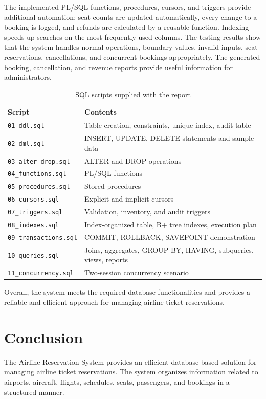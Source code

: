 \documentclass[12pt,a4paper]{article}
\begin{document}
The implemented PL/SQL functions, procedures, cursors, and triggers provide additional automation: seat
counts are updated automatically, every change to a booking is logged, and refunds are calculated by a
reusable function. Indexing speeds up searches on the most frequently used columns. The testing results show
that the system handles normal operations, boundary values, invalid inputs, seat reservations, cancellations,
and concurrent bookings appropriately. The generated booking, cancellation, and revenue reports provide
useful information for administrators.

\begin{table}[H]
\centering\small
\begin{tabularx}{\textwidth}{l X}
\toprule
\textbf{Script} & \textbf{Contents}\\
\midrule
\texttt{01\_ddl.sql} & Table creation, constraints, unique index, audit table\\
\texttt{02\_dml.sql} & INSERT, UPDATE, DELETE statements and sample data\\
\texttt{03\_alter\_drop.sql} & ALTER and DROP operations\\
\texttt{04\_functions.sql} & PL/SQL functions\\
\texttt{05\_procedures.sql} & Stored procedures\\
\texttt{06\_cursors.sql} & Explicit and implicit cursors\\
\texttt{07\_triggers.sql} & Validation, inventory, and audit triggers\\
\texttt{08\_indexes.sql} & Index-organized table, B+ tree indexes, execution plan\\
\texttt{09\_transactions.sql} & COMMIT, ROLLBACK, SAVEPOINT demonstration\\
\texttt{10\_queries.sql} & Joins, aggregates, GROUP BY, HAVING, subqueries, views, reports\\
\texttt{11\_concurrency.sql} & Two-session concurrency scenario\\
\bottomrule
\end{tabularx}
\caption{SQL scripts supplied with the report}
\end{table}
Overall, the system meets the required database functionalities and provides a reliable and efficient
approach for managing airline ticket reservations.

\section{Conclusion}
The Airline Reservation System provides an efficient database-based solution for managing airline ticket
reservations. The system organizes information related to airports, aircraft, flights, schedules, seats,
passengers, and bookings in a structured manner.
\end{document}
